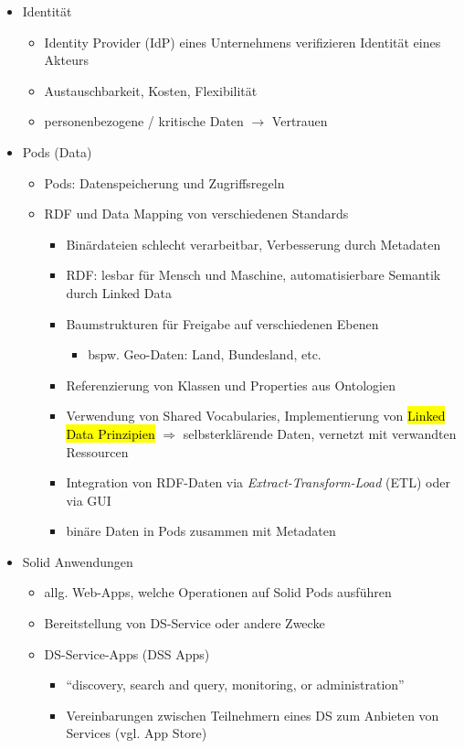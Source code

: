 \begin{itemize}
    \item Identität
    \begin{itemize}
        \item Identity Provider (IdP) eines Unternehmens verifizieren Identität eines Akteurs
        \item Austauschbarkeit, Kosten, Flexibilität
        \item personenbezogene / kritische Daten $\to$ Vertrauen
    \end{itemize}
    
    \item Pods (Data)
    \begin{itemize}
        \item Pods: Datenspeicherung und Zugriffsregeln
        \item RDF und Data Mapping von verschiedenen Standards
        \begin{itemize}
            \item Binärdateien schlecht verarbeitbar, Verbesserung durch Metadaten
            \item RDF: lesbar für Mensch und Maschine, automatisierbare Semantik durch Linked Data
            \item Baumstrukturen für Freigabe auf verschiedenen Ebenen
            \begin{itemize}
                \item bspw. Geo-Daten: Land, Bundesland, etc.
            \end{itemize}
            \item Referenzierung von Klassen und Properties aus Ontologien
            \item Verwendung von Shared Vocabularies, Implementierung von \hl{Linked Data Prinzipien} $\Rightarrow$ selbsterklärende Daten, vernetzt mit verwandten Ressourcen
            \item Integration von RDF-Daten via \emph{Extract-Transform-Load} (ETL) oder via GUI
            \item binäre Daten in Pods zusammen mit Metadaten~\cite{mecklerWebLinkedData2023}
        \end{itemize}
    \end{itemize}
    
    \item Solid Anwendungen
    \begin{itemize}
        \item allg. Web-Apps, welche Operationen auf Solid Pods ausführen
        \item Bereitstellung von DS-Service oder andere Zwecke
        \item DS-Service-Apps (DSS Apps)
        \begin{itemize}
            \item \enquote{discovery, search and query, monitoring, or administration}~\cite{mecklerWebLinkedData2023}
            \item Vereinbarungen zwischen Teilnehmern eines DS zum Anbieten von Services (vgl. App Store)
        \end{itemize}
    \end{itemize}


\end{itemize}
